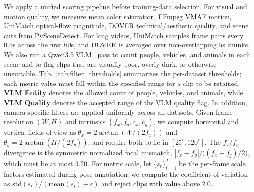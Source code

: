 \documentclass{llmxive}
\begin{document}
We apply a unified scoring pipeline before training-data selection.
For visual and motion quality, we measure mean color saturation, FFmpeg VMAF motion, UniMatch optical-flow magnitude, DOVER technical/aesthetic quality, and scene cuts from PySceneDetect.
For long videos, UniMatch samples frame pairs every 0.5s across the first 60s, and DOVER is averaged over non-overlapping 5s chunks.
We also run a Qwen3.5 VLM~\citep{qwen3_5} pass to count people, vehicles, and animals in each scene and to flag clips that are visually poor, overly dark, or otherwise unsuitable.
Tab.~\ref{tab:filter_thresholds} summarizes the per-dataset thresholds; each metric value must fall within the specified range for a clip to be retained.
\textbf{VLM Entity} denotes the allowed count of people, vehicles, and animals, while \textbf{VLM Quality} denotes the accepted range of the VLM quality flag.
In addition, camera-specific filters are applied uniformly across all datasets.
Given frame resolution $(W,H)$ and intrinsics $(f_x,f_y,c_x,c_y)$, we compute horizontal and vertical fields of view as $\theta_x=2\arctan(W/(2f_x))$ and $\theta_y=2\arctan(H/(2f_y))$, and require both to lie in $[25^\circ,120^\circ]$.
The $f_x/f_y$ divergence is the symmetric normalized focal mismatch,
$|f_x-f_y| / \bigl((f_x+f_y)/2\bigr)$, which must be at most $0.20$.
For metric scale, let $\{s_t\}_{t=1}^T$ be the per-frame scale factors estimated during pose annotation; we compute the coefficient of variation as $\mathrm{std}(s_t)/(\mathrm{mean}(s_t)+\epsilon)$ and reject clips with value above $2.0$.
\end{document}
